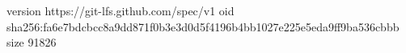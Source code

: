 version https://git-lfs.github.com/spec/v1
oid sha256:fa6e7bdcbcc8a9dd871f0b3e3d0d5f4196b4bb1027e225e5eda9ff9ba536cbbb
size 91826
